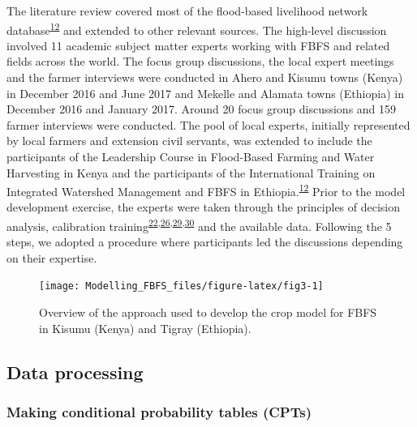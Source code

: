 \documentclass[12pt,oneside]{article}
\begin{document}
The literature review covered most of the flood-based livelihood network database\textsuperscript{\protect\hyperlink{ref-FBLN_2018}{12}} and extended to other relevant sources. The high-level discussion involved 11 academic subject matter experts working with FBFS and related fields across the world. The focus group discussions, the local expert meetings and the farmer interviews were conducted in Ahero and Kisumu towns (Kenya) in December 2016 and June 2017 and Mekelle and Alamata towns (Ethiopia) in December 2016 and January 2017. Around 20 focus group discussions and 159 farmer interviews were conducted. The pool of local experts, initially represented by local farmers and extension civil servants, was extended to include the participants of the Leadership Course in Flood-Based Farming and Water Harvesting in Kenya and the participants of the International Training on Integrated Watershed Management and FBFS in Ethiopia.\textsuperscript{\protect\hyperlink{ref-FBLN_2018}{12}} Prior to the model development exercise, the experts were taken through the principles of decision analysis, calibration training\textsuperscript{\protect\hyperlink{ref-Hubbard_2014}{22},\protect\hyperlink{ref-Luedeling_et_al_2015}{26},\protect\hyperlink{ref-Whitney_et_al_2018}{29},\protect\hyperlink{ref-Whitney_et_al_2018a}{30}} and the available data. Following the 5 steps, we adopted a procedure where participants led the discussions depending on their expertise.

\begin{figure}[!htbp]

{\centering \texttt{[image: Modelling\_FBFS\_files/figure-latex/fig3-1]} 

}

\caption{Overview of the approach used to develop the crop model for FBFS in Kisumu (Kenya) and Tigray (Ethiopia).}\label{fig:fig3}
\end{figure}

\hypertarget{III3}{%
\subsection{Data processing}\label{III3}}

\hypertarget{III31}{%
\subsubsection{Making conditional probability tables (CPTs)}\label{III31}}
\end{document}
